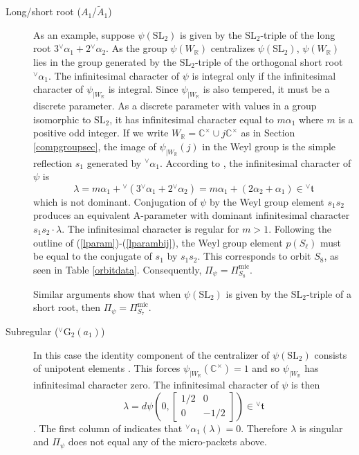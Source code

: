 \documentclass[a4paper, 11pt]{article}
\begin{document}
\begin{description}
\item[Long/short root ($A_{1}$/$\tilde{A}_{1}$)]  As an example,
  suppose $\psi(\mathrm{SL}_{2})$ is given by the
  $\mathrm{SL}_{2}$-triple of the  long  root
  $3{^\vee}\alpha_{1}+ 2 {^\vee}\alpha_{2}$.  As the group
  $\psi(W_{\mathbb{R}})$ centralizes $\psi(\mathrm{SL}_{2})$,
  $\psi(W_{\mathbb{R}})$  lies in the  
  group generated by the $\mathrm{SL}_{2}$-triple of the orthogonal short root
  ${^\vee}\alpha_{1}$.  
 The infinitesimal
  character of $\psi$ is integral  only if the infinitesimal character
  of $\psi_{|W_{\mathbb{R}}}$ is integral.  Since
  $\psi_{|W_{\mathbb{R}}}$ is also tempered, it must be
  a discrete parameter.  As a discrete parameter with values in a
  group isomorphic to
  $\mathrm{SL}_{2}$, it has infinitesimal character equal to 
$m \alpha_{1} $ where $m$ is a positive odd integer.  If we write
  $W_{\mathbb{R}} = \mathbb{C}^{\times} \cup j \mathbb{C}^{\times}$ as
  in Section \ref{compgroupsec},  the image of $\psi_{|W_{\mathbb{R}}}(j)$ in
  the Weyl group is the simple reflection $s_{1}$ generated by
  ${^\vee}\alpha_{1}$.  According to
\cite[(22.8)(c)]{ABV}, the infinitesimal character of $\psi$ is
$$\lambda = m \alpha_{1}  + {^\vee}(3{^\vee}\alpha_{1} + 2 {^\vee}\alpha_{2}) =
m \alpha_{1}  + (2\alpha_{2} + \alpha_{1})  \in {^\vee}\mathfrak{t}$$ 
which is not dominant.  Conjugation of $\psi$ by the Weyl group
element $s_{1}s_{2}$ produces an equivalent A-parameter with dominant
infinitesimal character $s_{1}s_{2} \cdot \lambda$.  The infinitesimal
character is regular for $m>1$.  Following the outline of
(\ref{lparam})-(\ref{lparambij}), the Weyl group element $p(S_{\ell})$
must be equal to 
the conjugate of $s_{1}$ by $s_{1}s_{2}$.  This corresponds to orbit
$S_{8}$, as seen in Table \ref{orbitdata}.  Consequently, $\Pi_{\psi}
= \Pi^{\mathrm{mic}}_{S_{8}}$.

Similar arguments show that when $\psi(\mathrm{SL}_{2})$ is given by
the $\mathrm{SL}_{2}$-triple of a short root, then $\Pi_{\psi} =
\Pi^{\mathrm{mic}}_{S_{7}}$.

\item[Subregular (${^\vee}\mathrm{G}_{2}(a_{1})$)] In this case the
  identity component of the centralizer of $\psi(\mathrm{SL}_{2})$
  consists of unipotent elements \cite[Table 7.12]{HumphCC}.  This
  forces $\psi_{|W_{\mathbb{R}}}(\mathbb{C}^{\times}) = 1$ and so
  $\psi_{|W_{\mathbb{R}}}$ has infinitesimal character zero.  The
  infinitesimal character of $\psi$ is then
\begin{equation}
\label{lampsi}
  \lambda = d\psi \left(0, \begin{bmatrix}1/2 & 0 \\ 0 &
    -1/2  \end{bmatrix}  \right) 
  \in {^\vee}\mathfrak{t}
\end{equation}
\cite[(22.8)(c)]{ABV}.
The first column of \cite[Table 7.12]{HumphCC} indicates that
${^\vee}\alpha_{1}(\lambda) = 0$.  Therefore $\lambda$ is singular and
$\Pi_{\psi}$ does not equal any of the micro-packets above.  


\end{description}
\end{document}

